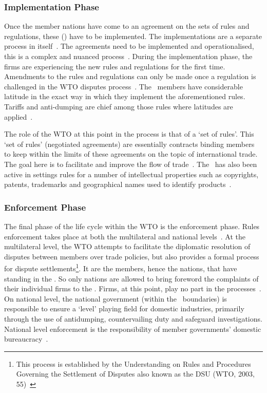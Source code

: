 \subsubsection{Implementation Phase}
Once the member nations have come to an agreement on the sets of rules and regulations, these (\rr) have to be implemented. 
The implementations are a separate process in itself~\citep{WTO:2013}. 
The agreements need to be implemented and operationalised, this is a complex and nuanced process~\citep{Lawton:2009vw}.
During the implementation phase, the firms are experiencing the new rules and regulations for the first time. 
Amendments to the rules and regulations can only be made once a regulation is challenged in the WTO disputes process~\citep{Lawton:2009vw}.
The \wto~members have considerable latitude in the exact way in which they implement the aforementioned rules. 
Tariffs and anti-dumping are chief among those rules where latitudes are applied~\citep{Hoda:2001, Reynolds:2009kc}.

The role of the WTO at this point in the process is that of a `set of rules'. 
This `set of rules' (negotiated agreements) are essentially contracts binding members to keep within the limits of these agreements on the topic of international trade.
The goal here is to facilitate and improve the flow of trade~\citep{WorldTradeOrganization:2008tz}.
The \wto~has also been active in settings rules for a number of intellectual properties such as copyrights, patents, trademarks and geographical names used to identify products~\citep{WTO:2013b}.


\subsubsection{Enforcement Phase}

The final phase of the life cycle within the WTO is the enforcement phase. 
Rules enforcement takes place at both the multilateral and national levels~\citep{Lawton:2009vw}. 
At the multilateral level, the WTO attempts to facilitate the diplomatic resolution of disputes between members over trade policies, but also provides a formal process for dispute settlements\footnote{This process is established by the Understanding on Rules and Procedures Governing the Settlement of Disputes also known as the \gls{DSU} (WTO, 2003, 55)~\citep{Lawton:2009vw}}.
It are the members, hence the nations, that have standing in the \wto.
So only nations are allowed to bring foreword the complaints of their individual firms to the \wto. 
Firms, at this point, play no part in the processes~\citep{WTO:2013c}.\\
On national level, the national government (within the \wto~boundaries) is responsible to ensure a `level' playing field for domestic industries, primarily through the use of antidumping, countervailing duty and safeguard investigations. 
National level enforcement is the responsibility of member governments’ domestic bureaucracy~\cite{Lawton:2009vw}.

